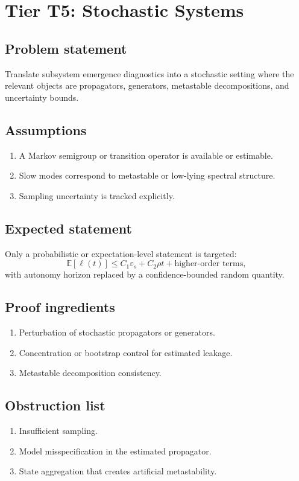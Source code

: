 \section{Tier T5: Stochastic Systems}

\subsection{Problem statement}
Translate subsystem emergence diagnostics into a stochastic setting where the relevant objects are propagators, generators, metastable decompositions, and uncertainty bounds.

\subsection{Assumptions}
\begin{enumerate}
\item A Markov semigroup or transition operator is available or estimable.
\item Slow modes correspond to metastable or low-lying spectral structure.
\item Sampling uncertainty is tracked explicitly.
\end{enumerate}

\subsection{Expected statement}
Only a probabilistic or expectation-level statement is targeted:
\[
\mathbb{E}[\ell(t)] \le C_1 \varepsilon_s + C_2 \rho t + \text{higher-order terms},
\]
with autonomy horizon replaced by a confidence-bounded random quantity.

\subsection{Proof ingredients}
\begin{enumerate}
\item Perturbation of stochastic propagators or generators.
\item Concentration or bootstrap control for estimated leakage.
\item Metastable decomposition consistency.
\end{enumerate}

\subsection{Obstruction list}
\begin{enumerate}
\item Insufficient sampling.
\item Model misspecification in the estimated propagator.
\item State aggregation that creates artificial metastability.
\end{enumerate}

